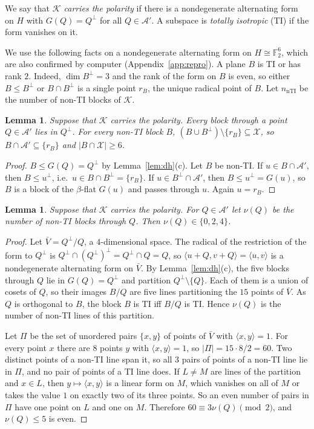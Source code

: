 \documentclass[11pt]{amsart}
\newtheorem{lemma}[theorem]{Lemma}
\theoremstyle{definition}
\newcommand{\F}{\mathbb{F}}
\newcommand{\K}{\mathcal{K}}
\newcommand{\X}{\mathcal{X}}
\newcommand{\A}{\mathcal{A}}
\newcommand{\nnti}{n_{\mathrm{nTI}}}
\begin{document}
We say that \emph{$\K$ carries the polarity} if there is a nondegenerate alternating form on $H$ with $G(Q)=Q^\perp$ for all $Q\in\A'$. A subspace is \emph{totally isotropic} (TI) if the form vanishes on it.

We use the following facts on a nondegenerate alternating form on $H\cong\F_2^6$, which are also confirmed by computer (Appendix~\ref{app:repro}). A plane $B$ is TI or has rank $2$. Indeed, $\dim B^\perp=3$ and the rank of the form on $B$ is even, so either $B\le B^\perp$ or $B\cap B^\perp$ is a single point $r_B$, the unique radical point of $B$. Let $\nnti$ be the number of non-TI blocks of $\K$.

\begin{lemma}\label{lem:polcons}
Suppose that $\K$ carries the polarity. Every block through a point $Q\in\A'$ lies in $Q^\perp$. For every non-TI block $B$, $(B\cup B^\perp)\setminus\{r_B\}\subseteq\X$, so $B\cap\A'\subseteq\{r_B\}$ and $|B\cap\X|\ge6$.
\end{lemma}
\begin{proof}
$B\le G(Q)=Q^\perp$ by Lemma~\ref{lem:dh}(c). Let $B$ be non-TI. If $u\in B\cap\A'$, then $B\le u^\perp$, i.e.\ $u\in B\cap B^\perp=\{r_B\}$. If $u\in B^\perp\cap\A'$, then $B\le u^\perp=G(u)$, so $B$ is a block of the $\beta$-flat $G(u)$ and passes through $u$. Again $u=r_B$.
\end{proof}


\begin{lemma}\label{lem:parity}
Suppose that $\K$ carries the polarity. For $Q\in\A'$ let $\nu(Q)$ be the number of non-TI blocks through $Q$. Then $\nu(Q)\in\{0,2,4\}$.
\end{lemma}
\begin{proof}
Let $\bar V=Q^\perp/Q$, a $4$-dimensional space. The radical of the restriction of the form to $Q^\perp$ is $Q^\perp\cap(Q^\perp)^\perp=Q^\perp\cap Q=Q$, so $\langle u+Q,v+Q\rangle=\langle u,v\rangle$ is a nondegenerate alternating form on $\bar V$. By Lemma~\ref{lem:dh}(c), the five blocks through $Q$ lie in $G(Q)=Q^\perp$ and partition $Q^\perp\setminus\{Q\}$. Each of them is a union of cosets of $Q$, so their images $B/Q$ are five lines partitioning the $15$ points of $\bar V$. As $Q$ is orthogonal to $B$, the block $B$ is TI iff $B/Q$ is TI. Hence $\nu(Q)$ is the number of non-TI lines of this partition.

Let $\Pi$ be the set of unordered pairs $\{x,y\}$ of points of $\bar V$ with $\langle x,y\rangle=1$. For every point $x$ there are $8$ points $y$ with $\langle x,y\rangle=1$, so $|\Pi|=15\cdot8/2=60$. Two distinct points of a non-TI line span it, so all $3$ pairs of points of a non-TI line lie in $\Pi$, and no pair of points of a TI line does. If $L\ne M$ are lines of the partition and $x\in L$, then $y\mapsto\langle x,y\rangle$ is a linear form on $M$, which vanishes on all of $M$ or takes the value $1$ on exactly two of its three points. So an even number of pairs in $\Pi$ have one point on $L$ and one on $M$. Therefore $60\equiv3\nu(Q)\pmod2$, and $\nu(Q)\le5$ is even.
\end{proof}
\end{document}
